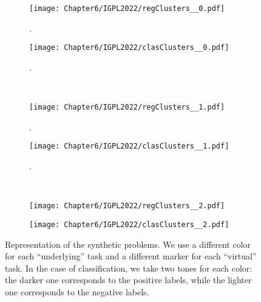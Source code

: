 

\begin{figure}[t!]
    \centering
    \begin{subfigure}[b]{0.49\textwidth}
        \centering
        \texttt{[image: Chapter6/IGPL2022/regClusters\_\_0.pdf]}
        \caption{.}
        \label{regClusters0}
    \end{subfigure}
    \hfill
    \begin{subfigure}[b]{0.49\textwidth}
        \centering
        \texttt{[image: Chapter6/IGPL2022/clasClusters\_\_0.pdf]}
        \caption{.}
        \label{clasClusters0}
    \end{subfigure}
    \\
    \begin{subfigure}[b]{0.49\textwidth}
        \centering
        \texttt{[image: Chapter6/IGPL2022/regClusters\_\_1.pdf]}
        \caption{.}
        \label{regClusters1}
    \end{subfigure}
    \hfill
    \begin{subfigure}[b]{0.49\textwidth}
        \centering
        \texttt{[image: Chapter6/IGPL2022/clasClusters\_\_1.pdf]}
        \caption{.}
        \label{clasClusters1}
    \end{subfigure}
    \\
    \begin{subfigure}[b]{0.49\textwidth}
        \centering
        \texttt{[image: Chapter6/IGPL2022/regClusters\_\_2.pdf]}
        \caption{}
        \label{regClusters2}
    \end{subfigure}
    \hfill
    \begin{subfigure}[b]{0.49\textwidth}
        \centering
        \texttt{[image: Chapter6/IGPL2022/clasClusters\_\_2.pdf]}
        \caption{}
        \label{clasClusters2}
    \end{subfigure}
    \caption{Representation of the synthetic problems. We use a different color for each ``underlying'' task and a different marker for each ``virtual'' task. In the case of classification, we take two tones for each color: the darker one corresponds to the positive labels, while the lighter one corresponds to the negative labels.}
\end{figure}

